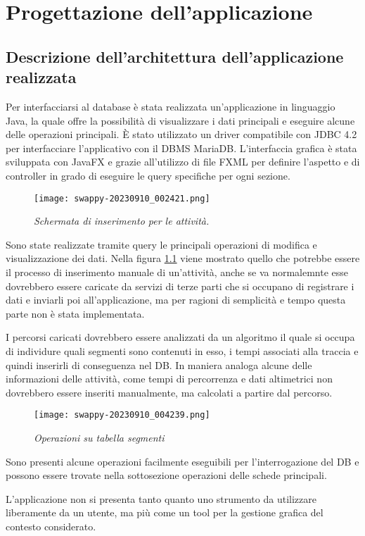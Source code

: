 \documentclass[12pt]{report}
\begin{document}
\chapter{Progettazione dell'applicazione}

\section{Descrizione dell'architettura dell'applicazione realizzata}

Per interfacciarsi al database è stata realizzata un'applicazione in linguaggio Java, la quale offre
la possibilità di visualizzare i dati principali e eseguire alcune delle operazioni principali.
È stato utilizzato un driver compatibile con JDBC 4.2 per interfacciare l'applicativo con il DBMS MariaDB.
L'interfaccia grafica è stata sviluppata con JavaFX e grazie all'utilizzo di file FXML per definire
l'aspetto e di controller in grado di eseguire le query specifiche per ogni sezione.

\begin{figure}[H]
    \texttt{[image: swappy-20230910\_002421.png]}
    \centering
    \caption{\emph{Schermata di inserimento per le attività.}}
    \label{img:image}
\end{figure}

Sono state realizzate tramite query le principali operazioni di modifica e visualizzazione dei dati.
Nella figura \ref*{img:image} viene mostrato quello che potrebbe essere il processo di inserimento manuale
di un'attività, anche se va normalemnte esse dovrebbero essere caricate da servizi di terze parti che si 
occupano di registrare i dati e inviarli poi all'applicazione, ma per ragioni di semplicità e tempo
questa parte non è stata implementata. 

I percorsi caricati dovrebbero essere analizzati da un algoritmo il quale si occupa di individure quali
segmenti sono contenuti in esso, i tempi associati alla traccia e quindi inserirli di conseguenza nel DB.
In maniera analoga alcune delle informazioni delle attività, come tempi di percorrenza e dati altimetrici
non dovrebbero essere inseriti manualmente, ma calcolati a partire dal percorso.

\begin{figure}[H]
    \texttt{[image: swappy-20230910\_004239.png]}
    \centering
    \caption{\emph{Operazioni su tabella segmenti}}
    \label{img:image_segmenti}
\end{figure}

Sono presenti alcune operazioni facilmente eseguibili per l'interrogazione del DB e possono essere trovate
nella sottosezione operazioni delle schede principali.

L'applicazione non si presenta tanto quanto uno strumento da utilizzare liberamente da un utente, ma più come
un tool per la gestione grafica del contesto considerato.
\end{document}
